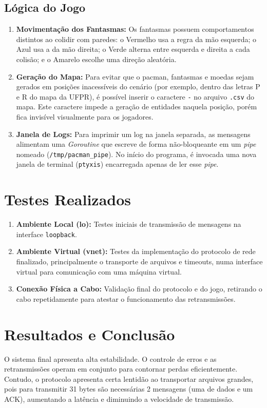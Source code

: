 \documentclass[12pt,a4paper]{article}
\begin{document}
\subsection{Lógica do Jogo}

\begin{enumerate}    
    \item \textbf{Movimentação dos Fantasmas:}
    Os fantasmas possuem comportamentos distintos ao colidir com paredes: o Vermelho usa a regra da mão esquerda; o Azul usa a da mão direita; o Verde alterna entre esquerda e direita a cada colisão; e o Amarelo escolhe uma direção aleatória.
    
    \item \textbf{Geração do Mapa:}
    Para evitar que o pacman, fantasmas e moedas sejam gerados em posições inacessíveis do cenário (por exemplo, dentro das letras P e R do mapa da UFPR), é possível inserir o caractere \texttt{-} no arquivo \texttt{.csv} do mapa. Este caractere impede a geração de entidades naquela posição, porém fica invisível visualmente para os jogadores.
    
    \item \textbf{Janela de Logs:}
    Para imprimir um log na janela separada, as mensagens alimentam uma \textit{Goroutine} que escreve de forma não-bloqueante em um \textit{pipe} nomeado (\texttt{/tmp/pacman\_pipe}). No início do programa, é invocada uma nova janela de terminal (\texttt{ptyxis}) encarregada apenas de ler esse \textit{pipe}.
\end{enumerate}

\section{Testes Realizados}
\begin{enumerate}
    \item \textbf{Ambiente Local (lo):} Testes iniciais de transmissão de mensagens na interface \texttt{loopback}.
    \item \textbf{Ambiente Virtual (vnet):} Testes da implementação do protocolo de rede finalizado, principalmente o transporte de arquivos e timeouts, numa interface virtual para comunicação com uma máquina virtual.
    \item \textbf{Conexão Física a Cabo:} Validação final do protocolo e do jogo, retirando o cabo repetidamente para atestar o funcionamento das retransmissões.
\end{enumerate}

\section{Resultados e Conclusão}

O sistema final apresenta alta estabilidade. O controle de erros e as retransmissões operam em conjunto para contornar perdas eficientemente. Contudo, o protocolo apresenta certa lentidão ao transportar arquivos grandes, pois para transmitir 31 bytes são necessárias 2 mensagens (uma de dados e um ACK), aumentando a latência e diminuindo a velocidade de transmissão.
\end{document}
